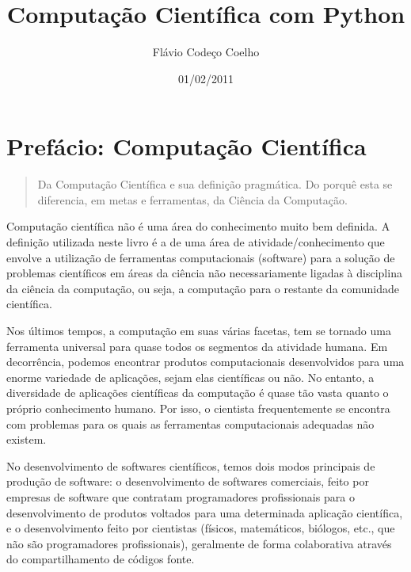 \documentclass[a4paper,10pt,portuguese]{sphinxmanual}
\title{Computação Científica com Python}
\date{01/02/2011}
\author{Flávio Codeço Coelho}
\begin{document}
\maketitle
\tableofcontents
{}\label{index::doc}



\chapter{Prefácio: Computação Científica}
\label{Cap1:prefacio-computacao-cientifica}\label{Cap1:prefacio}\label{Cap1::doc}\label{Cap1:computacao-cientifica-com-python}\begin{quote}

Da Computação Científica e sua definição pragmática. Do porquê esta se diferencia, em metas e ferramentas, da Ciência da Computação.
\end{quote}

Computação científica não é uma área do conhecimento muito bem definida. A definição utilizada neste livro é a de uma área de atividade/conhecimento que envolve a utilização de ferramentas computacionais (software) para a solução de problemas científicos em áreas da ciência não necessariamente ligadas à disciplina da ciência da computação, ou seja, a computação para o restante da comunidade científica.

Nos últimos tempos, a computação em suas várias facetas, tem se tornado uma ferramenta universal para quase todos os segmentos da atividade humana. Em decorrência, podemos encontrar produtos computacionais desenvolvidos para uma enorme variedade de aplicações, sejam elas científicas ou não. No entanto, a diversidade de aplicações científicas da computação é quase tão vasta quanto o próprio conhecimento humano. Por isso, o cientista frequentemente se encontra com problemas para os quais as ferramentas computacionais adequadas não existem.

No desenvolvimento de softwares científicos, temos dois modos principais de produção de software: o desenvolvimento de softwares comerciais, feito por empresas de software que contratam programadores profissionais para o desenvolvimento de produtos voltados para uma determinada aplicação científica, e o desenvolvimento feito por cientistas (físicos, matemáticos, biólogos, etc., que não são programadores profissionais), geralmente de forma colaborativa através do compartilhamento de códigos fonte.
\end{document}
